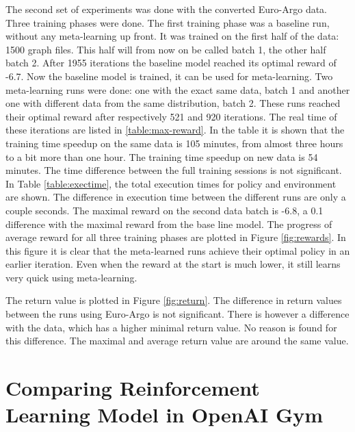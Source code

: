 

The second set of experiments was done with the converted Euro-Argo data.
Three training phases were done. The first training phase was a baseline run,
without any meta-learning up front. It was trained on the first half of the
data: 1500 graph files. This half will from now on be called batch 1, the
other half batch 2. After 1955 iterations the baseline model reached its
optimal reward of -6.7. Now the baseline model is trained, it can be used for
meta-learning. Two meta-learning runs were done: one with the exact same data,
batch 1 and another one with different data from the same distribution, batch
2. These runs reached their optimal reward after respectively 521 and 920
iterations. The real time of these iterations are listed in
\ref{table:max-reward}. In the table it is shown that the training time
speedup on the same data is 105 minutes, from almost three hours to a bit more
than one hour. The training time speedup on new data is 54 minutes. The time
difference between the full training sessions is not significant. In Table
\ref{table:exectime}, the total execution times for policy and environment are
shown. The difference in execution time between the different runs are only a
couple seconds. The maximal reward on the second data batch is -6.8, a 0.1
difference with the maximal reward from the base line model. The progress of
average reward for all three training phases are plotted in Figure
\ref{fig:rewards}. In this figure it is clear that the meta-learned runs
achieve their optimal policy in an earlier iteration. Even when the reward at
the start is much lower, it still learns very quick using meta-learning.

The return value is plotted in Figure \ref{fig:return}. The difference in return
values between the runs using Euro-Argo is not significant. There is however a
difference with the \mrlco data, which has a higher minimal return value. No
reason is found for this difference. The maximal and average return value are
around the same value.




\section{Comparing Reinforcement Learning Model in OpenAI Gym}

